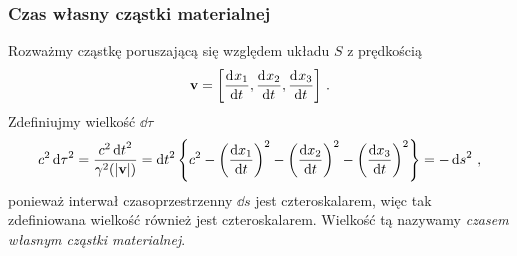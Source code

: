 \documentclass[../main.tex]{subfiles}
\begin{document}
\subsubsection{Czas własny cząstki materialnej}
Rozważmy cząstkę poruszającą się względem układu \(S\) z prędkością
\begin{equation*}
    \mathbf{v}=\left[\dv[]{x_1}{t},\dv[]{x_2}{t},\dv[]{x_3}{t}\right]\,.
\end{equation*}
Zdefiniujmy wielkość \(\dd{\tau}\)
\begin{equation*}
    c^2\dd{\tau}^2=\frac{c^2\dd{t}^2}{\gamma^2(|\mathbf{v}|)}=\dd{t}^2\left\{c^2-\left(\dv{x_1}{t}\right)^2-\left(\dv{x_2}{t}\right)^2-\left(\dv{x_3}{t}\right)^2\right\}=-\dd{s}^2\,,
\end{equation*}
ponieważ interwał czasoprzestrzenny \(\dd{s}\) jest czteroskalarem, więc tak zdefiniowana wielkość
również jest czteroskalarem. Wielkość tą nazywamy \textit{czasem własnym cząstki materialnej}.\\
\end{document}
